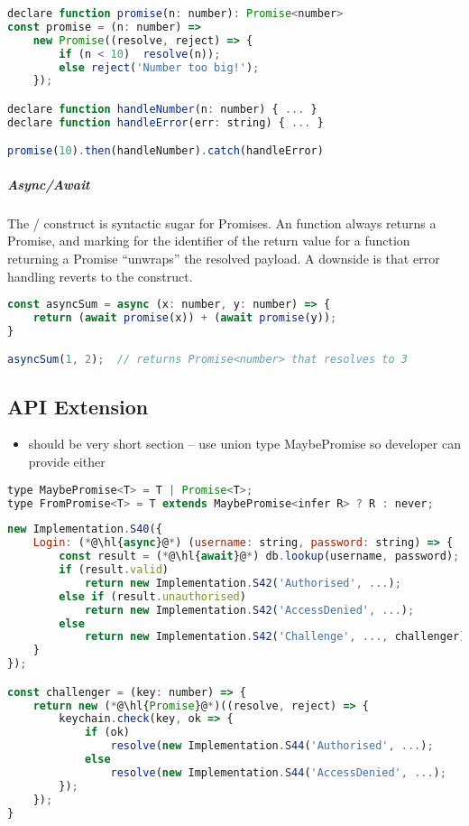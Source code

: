 \begin{lstlisting}[language=javascript,numbers=none]
declare function promise(n: number): Promise<number>
const promise = (n: number) => 
	new Promise((resolve, reject) => {
		if (n < 10)  resolve(n));
		else reject('Number too big!');
	});

declare function handleNumber(n: number) { ... } 
declare function handleError(err: string) { ... }

promise(10).then(handleNumber).catch(handleError)
\end{lstlisting}

\subparagraph{Async/Await}
The / construct
is syntactic sugar for Promises. An 
function always returns a Promise, and marking 
for the identifier of the return value for a function returning a Promise
``unwraps'' the resolved payload. A downside is that error handling
reverts to the  construct.

\begin{lstlisting}[language=javascript,numbers=none]
const asyncSum = async (x: number, y: number) => {
	return (await promise(x)) + (await promise(y));
}

asyncSum(1, 2);  // returns Promise<number> that resolves to 3
\end{lstlisting}

\subsection{API Extension}
\begin{itemize}
\item should be very short section -- use union type MaybePromise so developer can provide either
\end{itemize}

\begin{lstlisting}[language=javascript,numbers=none]
type MaybePromise<T> = T | Promise<T>;
type FromPromise<T> = T extends MaybePromise<infer R> ? R : never;
\end{lstlisting}

\begin{lstlisting}[language=javascript,tabsize=2]
new Implementation.S40({
	Login: (*@\hl{async}@*) (username: string, password: string) => {
		const result = (*@\hl{await}@*) db.lookup(username, password);
		if (result.valid)
			return new Implementation.S42('Authorised', ...);
		else if (result.unauthorised)
			return new Implementation.S42('AccessDenied', ...);
		else
			return new Implementation.S42('Challenge', ..., challenger);
	}
});

const challenger = (key: number) => {
	return new (*@\hl{Promise}@*)((resolve, reject) => {
		keychain.check(key, ok => {
			if (ok)
				resolve(new Implementation.S44('Authorised', ...);
			else 
				resolve(new Implementation.S44('AccessDenied', ...);	
		});
	});
}
\end{lstlisting}



